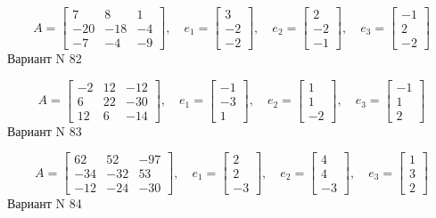 \documentclass[11pt]{report}
\begin{document}
$$A = \left[\begin{matrix}7 & 8 & 1\\-20 & -18 & -4\\-7 & -4 & -9\end{matrix}\right],\quad e_1 = \left[\begin{matrix}3\\-2\\-2\end{matrix}\right],\quad e_2 = \left[\begin{matrix}2\\-2\\-1\end{matrix}\right],\quad e_3 = \left[\begin{matrix}-1\\2\\-2\end{matrix}\right]$$Вариант N 82

$$A = \left[\begin{matrix}-2 & 12 & -12\\6 & 22 & -30\\12 & 6 & -14\end{matrix}\right],\quad e_1 = \left[\begin{matrix}-1\\-3\\1\end{matrix}\right],\quad e_2 = \left[\begin{matrix}1\\1\\-2\end{matrix}\right],\quad e_3 = \left[\begin{matrix}-1\\1\\2\end{matrix}\right]$$Вариант N 83

$$A = \left[\begin{matrix}62 & 52 & -97\\-34 & -32 & 53\\-12 & -24 & -30\end{matrix}\right],\quad e_1 = \left[\begin{matrix}2\\2\\-3\end{matrix}\right],\quad e_2 = \left[\begin{matrix}4\\4\\-3\end{matrix}\right],\quad e_3 = \left[\begin{matrix}1\\3\\2\end{matrix}\right]$$Вариант N 84
\end{document}

